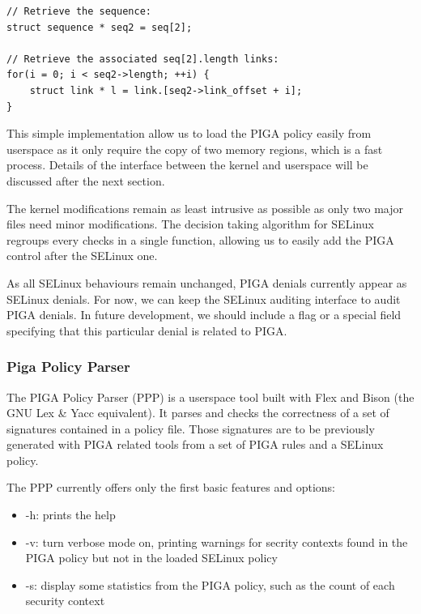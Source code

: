 \documentclass[pdftex,a4paper,titlepage,11pt]{article}
\begin{document}
\begin{lstlisting}
// Retrieve the sequence:
struct sequence * seq2 = seq[2];

// Retrieve the associated seq[2].length links:
for(i = 0; i < seq2->length; ++i) {
	struct link * l = link.[seq2->link_offset + i];
}
\end{lstlisting}

\smallskip

This simple implementation allow us to load the PIGA policy easily from userspace as it only require the copy of two memory regions, which is a fast process. Details of the interface between the kernel and userspace will be discussed after the next section.

\bigskip

The kernel modifications remain as least intrusive as possible as only two major files need minor modifications. The decision taking algorithm for SELinux regroups every checks in a single function, allowing us to easily add the PIGA control after the SELinux one.

\bigskip

As all SELinux behaviours remain unchanged, PIGA denials currently appear as SELinux denials. For now, we can keep the SELinux auditing interface to audit PIGA denials. In future development, we should include a flag or a special field specifying that this particular denial is related to PIGA.

\subsubsection{Piga Policy Parser}

The PIGA Policy Parser (PPP) is a userspace tool built with Flex and Bison (the GNU Lex \& Yacc equivalent). It parses and checks the correctness of a set of signatures contained in a policy file. Those signatures are to be previously generated with PIGA related tools from a set of PIGA rules and a SELinux policy.

The PPP currently offers only the first basic features and options:
\begin{itemize}
	\item -h: prints the help
	\item -v: turn verbose mode on, printing warnings for secrity contexts found in the PIGA policy but not in the loaded SELinux policy
	\item -s: display some statistics from the PIGA policy, such as the count of each security context
\end{itemize}
\end{document}
